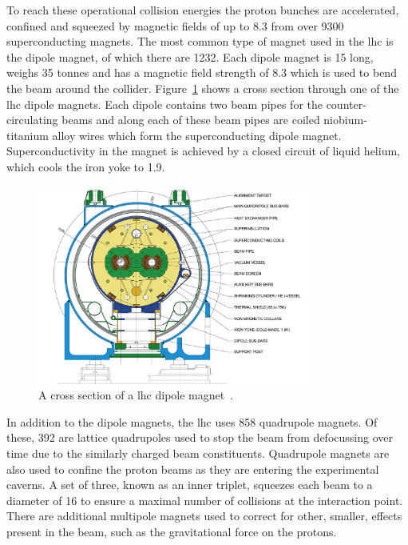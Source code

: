 To reach these operational collision energies the proton bunches are accelerated, confined and squeezed by magnetic fields of up to 8.3\Tesla{} from over 9300 superconducting magnets. 
The most common type of magnet used in the \acrshort{lhc} is the dipole magnet, of which there are 1232.
Each dipole magnet is 15\m{} long, weighs 35 tonnes and has a magnetic field strength of 8.3\Tesla{} which is used to bend the beam around the collider. 
Figure~\ref{fig:LHCdipole} shows a cross section through one of the \acrshort{lhc} dipole magnets.
Each dipole contains two beam pipes for the counter-circulating beams and along each of these beam pipes are coiled niobium-titanium alloy wires which form the superconducting dipole magnet. 
Superconductivity in the magnet is achieved by a closed circuit of liquid helium, which cools the iron yoke to 1.9\Kelvin{}.
\begin{figure}[htpb]
	\centering
	\includegraphics[width=0.8\textwidth]{Figures/LHCdipole}
	\caption[A cross section of a \acrshort{lhc} dipole magnet.]{A cross section of a \acrshort{lhc} dipole magnet~\cite{LHCdipolemagnet}. }
	\label{fig:LHCdipole}
\end{figure}

In addition to the dipole magnets, the \acrshort{lhc} uses 858 quadrupole magnets. 
Of these, 392 are lattice quadrupoles used to stop the beam from defocussing over time due to the similarly charged beam constituents. 
Quadrupole magnets are also used to confine the proton beams as they are entering the experimental caverns. A set of three, known as an inner triplet, squeezes each beam to a diameter of 16\um{} to ensure a maximal number of collisions at the interaction point.
There are additional multipole magnets used to correct for other, smaller, effects present in the beam, such as the gravitational force on the protons. 

